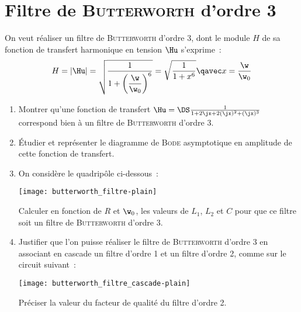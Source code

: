 \documentclass[a4paper, 12pt, final, garamond]{book}
\begin{document}
\section{Filtre de \textsc{Butterworth} d'ordre 3}
On veut réaliser un filtre de \textsc{Butterworth} d'ordre 3, dont le module $H$
de sa fonction de transfert harmonique en tension $\Hu$ s'exprime~:
\[H = \abs{\Hu} = \sqrt{\frac{1}{1+\left(\dfrac{\w}{\w_0}\right)^6}} =
	\sqrt{\frac{1}{1+x^6}}
	\qavec
	x = \frac{\w}{\w_0}
\]
\begin{enumerate}
	\item Montrer qu'une fonction de transfert $\Hu = \DS \frac{1}{1+2\jx +
			      2(\jx)^2 + (\jx)^3}$ correspond bien à un filtre de
	      \textsc{Butterworth} d'ordre 3.
	\item Étudier et représenter le diagramme de \textsc{Bode} asymptotique en
	      amplitude de cette fonction de transfert.
	\item On considère le quadripôle ci-dessous~:
	      \begin{center}
		      \texttt{[image: butterworth\_filtre-plain]}
	      \end{center}
	      Calculer en fonction de $R$ et $\w_0$, les valeurs de $L_1$, $L_2$ et
	      $C$ pour que ce filtre soit un filtre de \textsc{Butterworth} d'ordre 3.
	\item Justifier que l'on puisse réaliser le filtre de \textsc{Butterworth}
	      d'ordre 3 en associant en cascade un filtre d'ordre 1 et un filtre
	      d'ordre 2, comme sur le circuit suivant~:
	      \begin{center}
		      \texttt{[image: butterworth\_filtre\_cascade-plain]}
	      \end{center}
	      Préciser la valeur du facteur de qualité du filtre d'ordre 2.
\end{enumerate}
\end{document}
